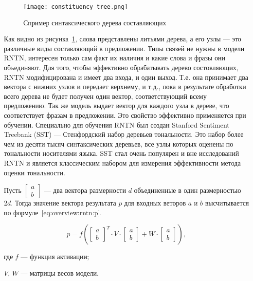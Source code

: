 \begin{figure}[h]
\centering
  \texttt{[image: constituency\_tree.png]}
  \caption{Спример синтаксического дерева составляющих}\label{fig:overview:constituency_tree}
\end{figure}

Как видно из рисунка~\ref{fig:overview:constituency_tree}, слова представлены литьями дерева, а его узлы --- это различные виды составляющий в предложении. Типы связей не нужны в модели RNTN, интересен только сам факт их наличия и какие слова и фразы они объединяют. Для того, чтобы эффективно обрабатывать дерево состовляющих, RNTN модифицирована и имеет два входа, и один выход. Т.е. она принимает два вектора с нижних узлов и передает верхнему, и т.д., пока в результате обработки всего дерева не будет получен один вектор, соответствующий всему предложению. Так же модель выдает вектор для каждого узла в дереве, что соответствует фразам в предложении. Это свойство эффективно применяется при обучении. Специально для обучения RNTN был создан Stanford Sentiment Treebank (SST) --- Стенфордский набор деревьев тональности. Это набор более чем из десяти тысяч синтаксических деревьев, все узлы которых оценены по тональности носителями языка. SST стал очень популярен и вне исследований RNTN и является классическим набором для измерения эффективности метода оценки тональности.

Пусть $\begin{bmatrix}a\\b\end{bmatrix}$ --- два вектора размерности $d$ объединенные в один размерностью $2d$. Тогда значение вектора результата $p$ для входных веторов $a$ и $b$ высчитывается по формуле~\ref{eq:overview:rntn:p}.

\begin{equation}
  \label{eq:overview:rntn:p}
  p = f(
  \begin{bmatrix}
    a\\
    b
  \end{bmatrix}^{T}\cdot{V}\cdot{
  \begin{bmatrix}
    a\\
    b
  \end{bmatrix}} + W\cdot{
  \begin{bmatrix}
    a\\
    b
  \end{bmatrix}}),
\end{equation}

\begin{explanationx}
\item [где $f$] --- функция активации;
\item $V$, $W$ --- матрицы весов модели.
\end{explanationx}

